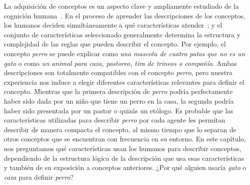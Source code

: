 La adquisición de conceptos es un aspecto clave y ampliamente estudiado de la cognición  humana~\cite{cohen2005handbook, ashby2011human}. En el proceso de aprender las descripciones de los conceptos, los humanos deciden simultáneamente a qué características atender~\cite{schyns1998development}; y el conjunto de características seleccionado generalmente determina la estructura y complejidad de las reglas que pueden describir el concepto. Por ejemplo, el concepto \textit{perro} se puede explicar como {\em una mascota de cuatro patas que no es un gato} o como {\em un animal para caza, pastoreo, tira de trineos o compañía}. Ambas descripciones son totalmente compatibles con el concepto \textit{perro}, pero nuestra experiencia nos induce a elegir diferentes características relevantes para definir el concepto. Mientras que la primera descripción de {\em perro} podría perfectamente haber sido dada por un niño que tiene un perro en la casa, la segunda podría haber sido presentada por un pastor o quizás un etólogo. Es probable que las características utilizadas para describir {\em perro} por cada agente les permitan describir de manera compacta el concepto, al mismo tiempo que lo separan de otros conceptos que se encuentran con frecuencia en su entorno. En este capítulo, nos preguntamos qué características usan los humanos para describir conceptos, dependiendo de la estructura lógica de la descripción que usa esas características y también de su exposición a conceptos anteriores. ¿Por qué alguien usaría {\em gato} o {\em caza} para definir {\em perro}?

